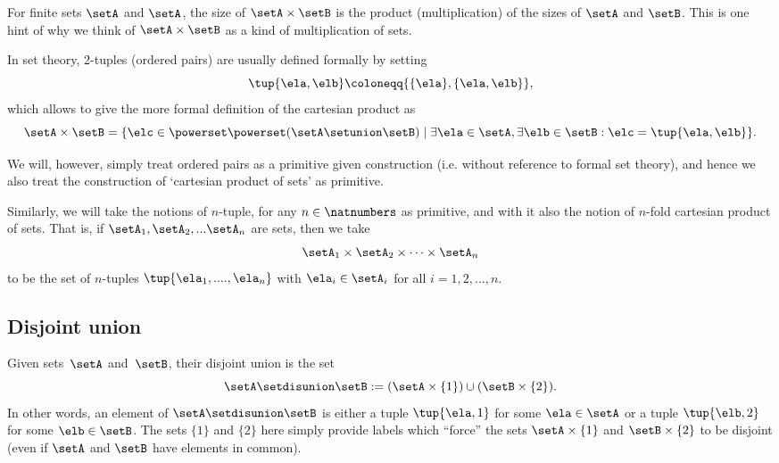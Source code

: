 \begin{remark}
For finite sets $\setA$ and $\setA$, the size of $\setA \times \setB$ is the product (multiplication) of the sizes of $\setA$ and $\setB$. This is one hint of why we think of $\setA \times \setB$ as a kind of multiplication of sets. 
\end{remark}

In set theory, 2-tuples (ordered pairs) are usually defined formally by setting
\begin{equation}
    \label{eq:ordered-pair}
    \tup{\ela, \elb} \coloneqq \{ \{\ela \} , \{ \ela, \elb \} \},
\end{equation}
which allows to give the more formal definition of the cartesian product as
            \begin{equation}
                \setA \times \setB = \{ \elc \in \powerset \powerset (\setA \setunion \setB) \mid \exists \ela \in \setA, \exists \elb \in \setB : \elc = \tup{\ela, \elb} \}.
            \end{equation}

We will, however, simply treat ordered pairs as a primitive given construction (i.e. without reference to formal set theory), and hence we also treat the construction of `cartesian product of sets' as primitive. 

Similarly, we will take the notions of $n$-tuple, for any $n \in \natnumbers$ as primitive, and with it also the notion of $n$-fold cartesian product of sets. That is, if $\setA_1, \setA_2, ... \setA_n$ are sets, then we take 
\begin{equation}
\setA_1 \times \setA_2 \times \dots \times \setA_n
\end{equation}
to be the set of $n$-tuples $\tup{\ela_1, ...., \ela_n}$ with $\ela_i \in \setA_i$ for all $i = 1,2,...,n$. 

\subsection{Disjoint union}

Given sets~$\setA$ and~$\setB$, their disjoint union is the set
\begin{equation*}
    \setA \setdisunion \setB := (\setA \times \{ 1 \}) \cup (\setB \times \{2\}).
\end{equation*}
In other words, an element of  $\setA \setdisunion \setB$ is either a tuple $\tup{\ela, 1}$ for some  $\ela \in \setA$ or a tuple $\tup{\elb, 2}$ for some $\elb \in \setB$. The sets $\{ 1 \}$ and $\{2\}$ here simply provide labels which ``force'' the sets $\setA \times \{ 1 \}$ and $\setB \times \{2\}$ to be disjoint (even if $\setA$ and $\setB$ have elements in common). 

